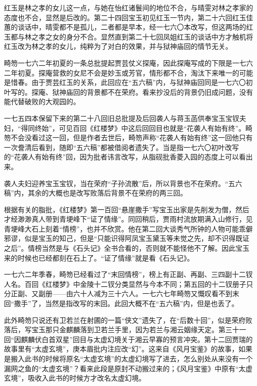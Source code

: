 \par 红玉是林之孝的女儿这一点，与她在怡红诸鬟间的地位不合，与晴雯对林之孝家的态度也不合，显然是后改的。第二十四回宝玉初见红玉一节内，第二十六回红玉佳蕙的谈话中，晴雯都不是孤儿，二者都是早本，经一七六〇本改写，但这两场的红玉都与林之孝之女的身分不合。显然直到第二十七回凤姐红玉的谈话中方才触机将红玉改为林之孝的女儿，纯粹为了对白的效果，并与狱神庙回的情节无关。
\par 畸笏一七六二年初夏的一条总批提起贾芸仗义探庵，因此探庵写成的下限是一七六二年初夏。探庵营救的女尼不会是妙玉或芳官，情形都不合，淘汰下来唯一的可能是惜春。由于贾芸红玉的关系，此回应在“五六稿”内，与狱神庙回同是一七六〇初叶写的。探庵、狱神庙回的背景都不在荣府。看来抄没后的背景仍旧成问题，没有能代替破败的大观园的。
\par 一七五四本保留下来的第二十八回旧总批提及后回袭人与蒋玉菡供奉宝玉宝钗夫妇，“得同终始”，可见百回《红楼梦》中这后回回目也就是“花袭人有始有终”。畸笏不会没看过这一回，但是作者去世后，畸笏声称“花袭人有始有终”这一回他只有一次誊清后看到，随即“五六稿”都被借阅者遗失了。当是指一七六〇初叶改写的“花袭人有始有终”回，因为批者讳言改写，从脂砚批香菱入园的态度上可以看出来。
\par 袭人夫妇迎养宝玉宝钗，当在荣府“子孙流散”后，所以背景也不在荣府。“五六稿”内，其余的大概也是改写败落后背景不在荣府的两三回。
\par 根据有关的脂批，《红楼梦》第一百回“悬崖撒手”写宝玉出家是先削发为僧，然后才经渺渺真人带到青埂峰下“证了情缘”。同回稍后，贾雨村流放期满入山修行，见青埂峰大石上刻着“情榜”，也并不欣赏。他在第二回大谈秀气所钟的人物可能乖僻邪谬，似是宝玉的知己，但是“只能识得阿凤宝玉黛玉等未觉之先，却不识得既证之后”。情榜当然是与《石头记》全书合看的，否则就不能怪他不了解。因此宝玉来的时候也已经都刻在石上了。“证了情缘”就是看《石头记》。
\par 一七六二年季春，畸笏已经看过了“末回情榜”，榜上有正副、再副、三四副十二钗人名。百回《红楼梦》中金陵十二钗分类显然与今本不同；第五回的十二钗册子只分正副、又副册——由六十人减为三十六人。一七六七年畸笏又慨叹看不到末回“撒手”了，当然是指改写的末回。此回大概不在“五六稿”内，但是也丢了。
\par 此外畸笏只说还有卫若兰在射圃的一篇“侠文”遗失了，在“后数十回”，似是荣府败落后，写宝玉那只金麒麟落到卫若兰手里，因为若兰与湘云姻缘天定。第三十一回“因麒麟伏白首双星”回目与太虚幻境关于湘云早寡的预言冲突。第十二回贾瑞的故事里有“太虚玄境”，庚本眉批内注应改“幻”。这来自《风月宝鉴》的故事，如果是搬入此书的时候将原名“太虚玄境”的太虚幻境写了进去，怎么别处从来没有一个漏网之鱼的“太虚玄境”？看来此段是原封不动搬过来的；《风月宝鉴》中原有“太虚玄境”，吸收入此书的时候方才改名太虚幻境。
